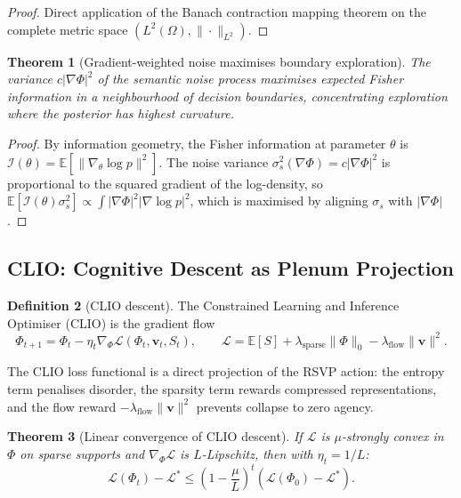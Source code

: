 \documentclass[12pt, a4paper]{article}
\theoremstyle{plain}
\newtheorem{theorem}{Theorem}[section]
\theoremstyle{definition}
\newtheorem{definition}[theorem]{Definition}
\theoremstyle{remark}
\newcommand{\vfield}{\mathbf{v}}
\begin{document}
\begin{proof}
Direct application of the Banach contraction mapping theorem on the complete metric space
$(L^2(\Omega), \|\cdot\|_{L^2})$.
\end{proof}

\begin{theorem}[Gradient-weighted noise maximises boundary exploration]
The variance $c|\nabla\Phi|^2$ of the semantic noise process maximises expected Fisher
information in a neighbourhood of decision boundaries, concentrating exploration where
the posterior has highest curvature.
\end{theorem}

\begin{proof}
By information geometry, the Fisher information at parameter $\theta$ is
$\mathcal{I}(\theta) = \mathbb{E}[\|\nabla_\theta\log p\|^2]$.  The noise variance
$\sigma_s^2(\nabla\Phi) = c|\nabla\Phi|^2$ is proportional to the squared gradient of the
log-density, so $\mathbb{E}[\mathcal{I}(\theta)\sigma_s^2] \propto \int|\nabla\Phi|^2|\nabla\log p|^2$,
which is maximised by aligning $\sigma_s$ with $|\nabla\Phi|$.
\end{proof}

\subsection{CLIO: Cognitive Descent as Plenum Projection}

\begin{definition}[CLIO descent]
The Constrained Learning and Inference Optimiser (CLIO) is the gradient flow
\[
\Phi_{t+1} = \Phi_t - \eta_t\nabla_\Phi\mathcal{L}(\Phi_t, \vfield_t, S_t),
\qquad
\mathcal{L} = \mathbb{E}[S] + \lambda_{\mathrm{sparse}}\|\Phi\|_0 - \lambda_{\mathrm{flow}}\|\vfield\|^2.
\]
\end{definition}

The CLIO loss functional is a direct projection of the RSVP action: the entropy term
penalises disorder, the sparsity term rewards compressed representations, and the flow
reward $-\lambda_{\mathrm{flow}}\|\vfield\|^2$ prevents collapse to zero agency.

\begin{theorem}[Linear convergence of CLIO descent]
\label{thm:clio}
If $\mathcal{L}$ is $\mu$-strongly convex in $\Phi$ on sparse supports and
$\nabla_\Phi\mathcal{L}$ is $L$-Lipschitz, then with $\eta_t = 1/L$:
\[
\mathcal{L}(\Phi_t) - \mathcal{L}^* \leq \left(1 - \frac{\mu}{L}\right)^t(\mathcal{L}(\Phi_0) - \mathcal{L}^*).
\]
\end{theorem}
\end{document}

